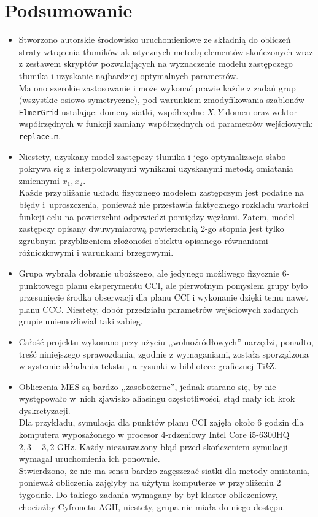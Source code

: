 \documentclass{sprawozdanie-agh}
\begin{document}
\section{Podsumowanie}
\newcommand{\TikZ}{Ti\textit{k}Z\xspace}
\begin{itemize}
    \item Stworzono autorskie środowisko uruchomieniowe ze składnią do obliczeń straty wtrącenia tłumików akustycznych metodą elementów skończonych wraz z zestawem skryptów pozwalających na wyznaczenie modelu zastępczego tłumika i uzyskanie najbardziej optymalnych parametrów.\\Ma ono szerokie zastosowanie i może wykonać prawie każde z zadań grup (wszystkie osiowo symetryczne), pod warunkiem zmodyfikowania szablonów \texttt{ElmerGrid} ustalając: domeny siatki, współrzędne $X,Y$ domen oraz wektor współrzędnych w funkcji zamiany współrzędnych od parametrów wejściowych: \hyperref[list5]{\texttt{replace.m}}.
    \item Niestety, uzyskany model zastępczy tłumika i jego optymalizacja słabo pokrywa się z~interpolowanymi wynikami uzyskanymi metodą omiatania zmiennymi $x_1, x_2$.\\Każde przybliżanie układu fizycznego modelem zastępczym jest podatne na błędy i~uproszczenia, ponieważ nie przestawia faktycznego rozkładu wartości funkcji celu na powierzchni odpowiedzi pomiędzy węzłami. Zatem, model zastępczy opisany dwuwymiarową powierzchnią 2-go stopnia jest tylko zgrubnym przybliżeniem złożoności obiektu opisanego równaniami różniczkowymi i warunkami brzegowymi.
    \item Grupa wybrała dobranie uboższego, ale jedynego możliwego fizycznie 6-punktowego planu eksperymentu CCI, ale pierwotnym pomysłem grupy było przesunięcie środka obserwacji dla planu CCI i wykonanie dzięki temu nawet planu CCC. Niestety, dobór przedziału parametrów wejściowych zadanych grupie uniemożliwiał taki zabieg. 
    \item Całość projektu wykonano przy użyciu ,,wolnoźródłowych'' narzędzi, ponadto, treść niniejszego sprawozdania, zgodnie z wymaganiami, została sporządzona w systemie składania tekstu \LaTeXe{}, a rysunki w bibliotece graficznej \TikZ.
    \item Obliczenia MES są bardzo ,,zasobożerne'', jednak starano się, by nie występowało w~nich zjawisko aliasingu częstotliwości, stąd mały ich krok dyskretyzacji.\\Dla przykładu, symulacja dla punktów planu CCI zajęła około 6 godzin dla komputera wyposażonego w procesor 4-rdzeniowy Intel Core i5-6300HQ $2,3-3,2$ GHz. Każdy niezauważony błąd przed skończeniem symulacji wymagał uruchomienia ich ponownie.\\Stwierdzono, że nie ma sensu bardzo zagęszczać siatki dla metody omiatania, ponieważ obliczenia zajęłyby na użytym komputerze w przybliżeniu 2 tygodnie. Do takiego zadania wymagany by był klaster obliczeniowy, chociażby Cyfronetu AGH, niestety, grupa nie miała do niego dostępu.

\end{itemize}
\end{document}
